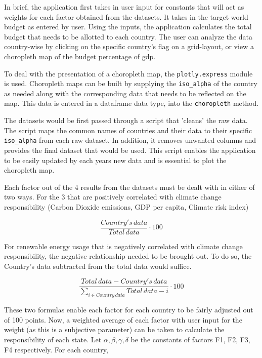 \documentclass[fontsize=11pt]{article}
\begin{document}
In brief, the application first takes in user input for constants that will act as weights for each factor obtained
from the datasets.
It takes in the target world budget as entered by user.
Using the inputs, the application calculates the total budget that needs to be allotted to each country.
The user can analyze the data country-wise by clicking on the specific country's flag on a grid-layout, or view a
choropleth map of the budget percentage of gdp.\newline

To deal with the presentation of a choropleth map, the \texttt{plotly.express}
module is used.
Choropleth maps can be built by supplying the \texttt{iso\_alpha} of the country as needed along with the corresponding
data that needs to be reflected on the map.
This data is entered in a dataframe data type, into the \texttt{choropleth} method.  \newline

The datasets would be first passed through a script that 'cleans' the raw data.
The script maps the common names of countries and their data to their specific
\texttt{iso\_alpha} from each raw dataset.
In addition, it removes unwanted columns and provides the final dataset that would be used.
This script enables the application to be easily updated by each years new data and is essential to plot the choropleth map.
\newline

Each factor out of the 4 results from the datasets must be
dealt with in either of two ways.
For the 3 that are positively correlated with climate change responsibility (Carbon Dioxide emissions,
GDP per capita, Climate risk index)

\[
\frac{Country's \, data}{Total \, data} \cdot 100
\]

For renewable energy usage that is negatively correlated with climate change responsibility, the
negative relationship needed to be brought out.
To do so, the Country's data subtracted from the total data would suffice.

\[
\frac{Total \, data - Country's \, data}{\displaystyle\sum_{i \in Country \, data} Total \, data -  i } \cdot 100
\]

These two formulas enable each factor for each country to be fairly adjusted out of 100 points.
Now, a weighted average of each factor with user input for the weight (as this is a subjective parameter) can be taken
to calculate the responsibility of each state.
Let $\alpha, \beta, \gamma, \delta$ be the constants of factors F1, F2, F3, F4 respectively.
For each country,
\end{document}
